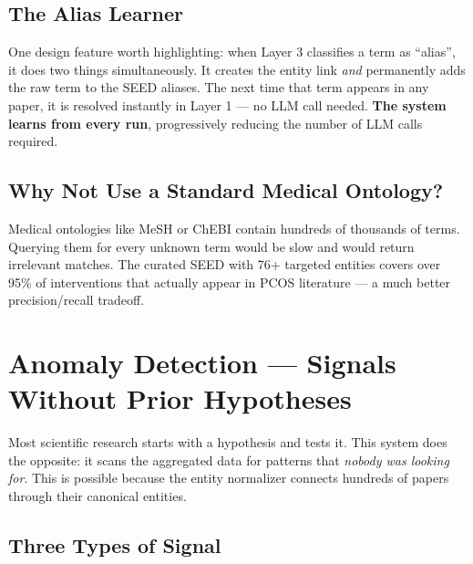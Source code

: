 \documentclass[11pt,a4paper]{article}
\begin{document}
\subsection{The Alias Learner}

One design feature worth highlighting: when Layer 3 classifies a term as
``alias'', it does two things simultaneously. It creates the entity link
\textit{and} permanently adds the raw term to the SEED aliases.
The next time that term appears in any paper, it is resolved instantly in
Layer 1 --- no LLM call needed. \textbf{The system learns from every run},
progressively reducing the number of LLM calls required.

\subsection{Why Not Use a Standard Medical Ontology?}

Medical ontologies like MeSH or ChEBI contain hundreds of thousands of terms.
Querying them for every unknown term would be slow and would return irrelevant matches.
The curated SEED with 76+ targeted entities covers over 95\% of interventions
that actually appear in PCOS literature --- a much better precision/recall tradeoff.

\section{Anomaly Detection --- Signals Without Prior Hypotheses}

Most scientific research starts with a hypothesis and tests it. This system
does the opposite: it scans the aggregated data for patterns that \textit{nobody
was looking for}. This is possible because the entity normalizer connects
hundreds of papers through their canonical entities.

\subsection{Three Types of Signal}
\end{document}
